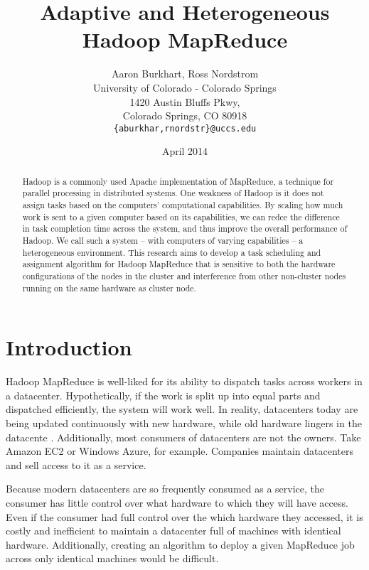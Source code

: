 \documentclass{sig-alternate}
\begin{document}
\title{Adaptive and Heterogeneous Hadoop MapReduce}
\author{Aaron Burkhart, Ross Nordstrom\\
        University of Colorado - Colorado Springs\\
        1420 Austin Bluffs Pkwy,\\
        Colorado Springs, CO 80918\\
        \texttt{\{aburkhar,rnordstr\}@uccs.edu}
       }
\date{April 2014}

\maketitle

\begin{abstract}
Hadoop is a commonly used Apache implementation of MapReduce, a technique for
parallel processing in distributed systems. One weakness of Hadoop is it does
not assign tasks based on the computers’ computational capabilities. By scaling
how much work is sent to a given computer based on its capabilities, we can
redce the difference in task completion time across the system, and thus improve
the overall performance of Hadoop. We call such a system – with computers of
varying capabilities – a heterogeneous environment. This research aims to develop
a task scheduling and assignment algorithm for Hadoop MapReduce that is sensitive 
to both the hardware configurations of the nodes in the cluster and interference
from other non-cluster nodes running on the same hardware as cluster node.
\end{abstract}


\section{Introduction}
Hadoop MapReduce is well-liked for its ability to dispatch tasks across workers
in a datacenter. Hypothetically, if the work is split up into equal parts and dispatched
efficiently, the system will work well. In reality, datacenters today are being
updated continuously with new hardware, while old hardware lingers in the datacente
. Additionally, most consumers of datacenters are not the owners. Take Amazon EC2
or Windows Azure, for example. Companies maintain datacenters and sell access to
it as a service. 

Because modern datacenters are so frequently consumed as a service, the consumer
has little control over what hardware to which they will have access. Even if the
consumer had full control over the which hardware they accessed, it is costly and
inefficient to maintain a datacenter full of machines with identical hardware. 
Additionally, creating an algorithm to deploy a given MapReduce job across only 
identical machines would be difficult.
\end{document}
